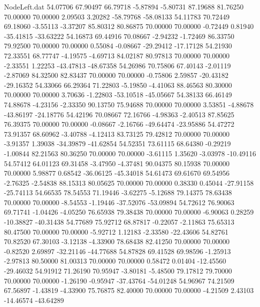 \begin{filecontents}{NodeLeft.dat}
  54.07706   67.90497   66.79718    -5.87894   -5.80731   87.19688   81.76250   70.00000   70.00000    2.09503    3.20282  -58.79768  -58.08133
  54.11783   70.72449   69.18060    -3.55113   -3.37207   85.80312   80.86875   70.00000   70.00000   -0.72449    0.81940  -35.41815  -33.63222
  54.16873   69.44916   70.08667    -2.94232   -1.72469   86.33750   79.92500   70.00000   70.00000    0.55084   -0.08667  -29.29412  -17.17128
  54.21930   72.33551   68.77747    -4.19575   -4.69713   84.02187   80.97813   70.00000   70.00000   -2.33551    1.22253  -43.47813  -48.67358
  54.26986   70.75806   67.40143    -2.01119   -2.87069   84.32500   82.83437   70.00000   70.00000   -0.75806    2.59857  -20.43182  -29.16352
  54.33066   66.29364   71.22803    -5.19850   -4.41063   88.46563   80.30000   70.00000   70.00000    3.70636   -1.22803  -53.10518  -45.05667
  54.38133   66.46149   74.88678    -4.23156   -2.33350   90.13750   75.94688   70.00000   70.00000    3.53851   -4.88678  -43.86197  -24.18776
  54.42196   70.08667   72.16766    -4.98363   -2.40513   87.85625   76.39375   70.00000   70.00000   -0.08667   -2.16766  -49.64474  -23.95886
  54.47272   73.91357   68.60962    -3.40788   -4.12413   83.73125   79.42812   70.00000   70.00000   -3.91357    1.39038  -34.39879  -41.62854
  54.52351   73.61115   68.64380    -0.29219   -1.00844   82.21563   80.36250   70.00000   70.00000   -3.61115    1.35620   -3.03978  -10.49116
  54.57412   64.01123   69.31458    -3.47950   -4.37481   90.04375   80.15938   70.00000   70.00000    5.98877    0.68542  -36.06125  -45.34018
  54.61473   69.61670   69.54956    -2.76325   -2.54838   88.15313   80.05625   70.00000   70.00000    0.38330    0.45044  -27.91158  -25.74113
  54.66535   78.54553   71.19446    -3.62275   -5.12688   79.14375   78.63438   70.00000   70.00000   -8.54553   -1.19446  -37.52076  -53.09894
  54.72612   76.90063   69.71741    -1.04426   -4.05250   76.65938   79.38438   70.00000   70.00000   -6.90063    0.28259  -10.38827  -40.31438
  54.77689   75.92712   68.87817    -0.22057   -2.11863   75.65313   80.47500   70.00000   70.00000   -5.92712    1.12183   -2.33580  -22.43606
  54.82761   70.82520   67.30103    -3.12138   -4.33900   78.68438   82.41250   70.00000   70.00000   -0.82520    2.69897  -32.21146  -44.77688
  54.87828   69.41528   69.98596    -1.25913   -2.97813   80.50000   81.00313   70.00000   70.00000    0.58472    0.01404  -12.45560  -29.46032
  54.91912   71.26190   70.95947    -3.80181   -5.48500   79.17812   79.70000   70.00000   70.00000   -1.26190   -0.95947  -37.43764  -54.01248
  54.96967   74.21509   67.56897    -1.43819   -4.33900   75.76875   82.40000   70.00000   70.00000   -4.21509    2.43103  -14.46574  -43.64289

\end{filecontents}
